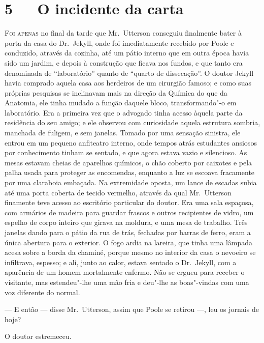 \chapter[5\ \ \ O incidente da carta]{5\ \ \ O incidente da carta}

\textsc{Foi apenas} no final da tarde que Mr.~Utterson conseguiu finalmente bater
à porta da casa do Dr.~Jekyll, onde foi imediatamente recebido por
Poole e conduzido, através da cozinha, até um pátio interno que em
outra época havia sido um jardim, e depois à construção que ficava nos
fundos, e que tanto era denominada de “laboratório” quanto de “quarto
de dissecação”.  O doutor Jekyll havia comprado aquela casa aos
herdeiros de um cirurgião famoso; e como suas próprias pesquisas se
inclinavam mais na direção da Química do que da Anatomia, ele tinha
mudado a função daquele bloco, transformando"-o em laboratório.  Era a
primeira vez que o advogado tinha acesso àquela parte da residência do
seu amigo; e ele observou com curiosidade  aquela estrutura sombria,
manchada de fuligem, e sem janelas.  Tomado por uma sensação sinistra,
ele entrou em um pequeno anfiteatro interno, onde tempos atrás
estudantes ansiosos por conhecimento tinham se sentado, e que agora
estava vazio e silencioso.  As mesas estavam cheias de aparelhos
químicos, o chão coberto por caixotes e pela palha usada para proteger
as encomendas, enquanto a luz se escoava fracamente por uma claraboia
embaçada. Na extremidade oposta, um lance de escadas subia até uma
porta coberta de tecido vermelho, através da qual Mr.~Utterson
finamente teve acesso ao escritório particular do doutor.  Era uma sala
espaçosa, com armários de madeira para guardar frascos e outros
recipientes de vidro, um espelho de corpo inteiro que girava na
moldura, e uma mesa de trabalho.  Três janelas dando para o pátio da
rua de trás, fechadas por barras de ferro, eram a única abertura para o
exterior.  O fogo ardia na lareira, que tinha uma lâmpada acesa sobre a
borda da chaminé, porque mesmo no interior da casa o nevoeiro se
infiltrava, espesso; e ali, junto ao calor, estava sentado o Dr.~Jekyll, 
com a aparência de um homem mortalmente enfermo.  Não se ergueu
para receber o visitante, mas estendeu"-lhe uma mão fria e deu"-lhe as
boas"-vindas com uma voz diferente do normal.

--- E então --- disse Mr.~Utterson, assim que Poole se retirou ---, leu os
jornais de hoje?

O doutor estremeceu.

